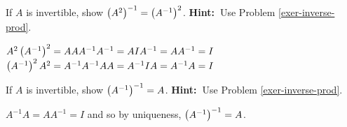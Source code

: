 \begin{enumialphparenastyle}
\begin{ex}If $A$ is invertible, show $\left(A^{2}\right) ^{-1}=\left(
A^{-1}\right) ^{2}$. \textbf{Hint:\ }Use Problem \ref{exer-inverse-prod}. 
\begin{sol}
$A^{2}\left(A^{-1}\right) ^{2}=AAA^{-1}A^{-1}=AIA^{-1}=AA^{-1}=I$ $\left(
A^{-1}\right) ^{2}A^{2}=A^{-1}A^{-1}AA=A^{-1}IA=A^{-1}A=I$
\end{sol}
\end{ex}

\begin{ex}If $A$ is invertible, show $\left(A^{-1}\right) ^{-1}=A$. 
\textbf{Hint:\ }Use Problem \ref{exer-inverse-prod}. 
\begin{sol}
 $A^{-1}A=AA^{-1}=I$ and so by
uniqueness, $\left(A^{-1}\right) ^{-1}=A$.
\end{sol}
\end{ex}

\end{enumialphparenastyle}
